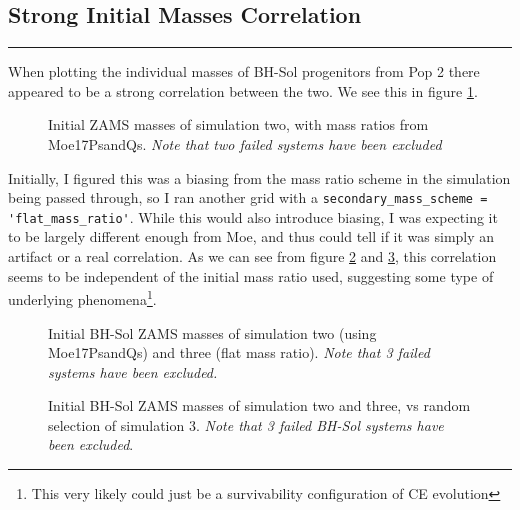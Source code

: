\documentclass{article}
\theoremstyle{mytheoremstyle}
\theoremstyle{mytheoremstyle}
\theoremstyle{myproblemstyle}
\theoremstyle{myproblemstyle}
\begin{document}
\subsection{Strong Initial Masses Correlation}
\hrule
\vspace{.5cm}

When plotting the individual masses of BH-Sol progenitors from Pop 2 there appeared to be a strong correlation between the two. We see this in figure \ref{fig:InitMassesBHSOL}.

\begin{figure}[H]
    \centering
    \resizebox{0.85\textwidth}{!}{} 
    \caption{Initial ZAMS masses of simulation two, with mass ratios from Moe17PsandQs. \textit{Note that two failed systems have been excluded}}
    \label{fig:InitMassesBHSOL}
\end{figure}

Initially, I figured this was a biasing from the mass ratio scheme in the simulation being passed through, so I ran another grid with a \verb|secondary_mass_scheme = 'flat_mass_ratio'|. While this would also introduce biasing, I was expecting it to be largely different enough from Moe, and thus could tell if it was simply an artifact or a real correlation. As we can see from figure \ref{fig:Moe17InitMassesBHSOL} and \ref{fig:RandSampleInitMassesBHSOL}, this correlation seems to be independent of the initial mass ratio used, suggesting some type of underlying phenomena\footnote{This very likely could just be a survivability configuration of CE evolution}.  

\begin{figure}[H]
    \centering
    \resizebox{0.85\textwidth}{!}{} 
    \caption{Initial BH-Sol ZAMS masses of simulation two (using Moe17PsandQs) and three (flat mass ratio). \textit{Note that 3 failed systems have been excluded.}}
    \label{fig:Moe17InitMassesBHSOL}
\end{figure}

\begin{figure}[H]
    \centering
    \resizebox{0.85\textwidth}{!}{} 
    \caption{Initial BH-Sol ZAMS masses of simulation two and three, vs random selection of simulation 3. \textit{Note that 3 failed BH-Sol systems have been excluded}.}
    \label{fig:RandSampleInitMassesBHSOL}
\end{figure}
\end{document}
